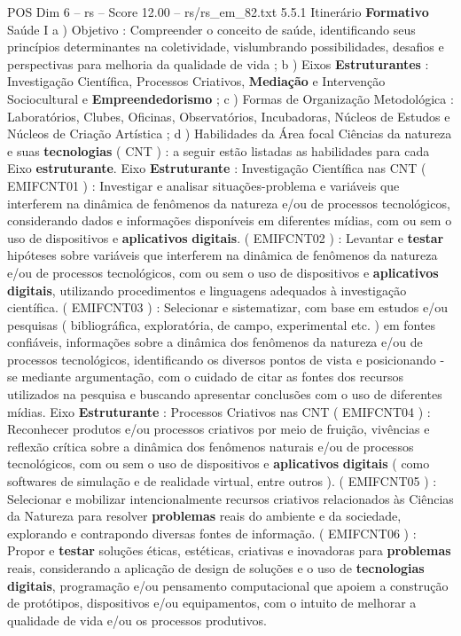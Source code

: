 \begin{textsample}{POS Dim 6 – rs – Score 12.00 – rs/rs\_em\_82.txt}  \label{ex:f6_pos_181}
5.5.1 Itinerário \textbf{Formativo} Saúde I a ) Objetivo : Compreender o conceito de saúde, identificando seus princípios determinantes na coletividade, vislumbrando possibilidades, desafios e perspectivas para melhoria da qualidade de vida ; b ) Eixos \textbf{Estruturantes} : Investigação Científica, Processos Criativos, \textbf{Mediação} e Intervenção Sociocultural e \textbf{Empreendedorismo} ; c ) Formas de Organização Metodológica : Laboratórios, Clubes, Oficinas, Observatórios, Incubadoras, Núcleos de Estudos e Núcleos de Criação Artística ; d ) Habilidades da Área focal Ciências da natureza e suas \textbf{tecnologias} ( CNT ) : a seguir estão listadas as habilidades para cada Eixo \textbf{estruturante}.
Eixo \textbf{Estruturante} : Investigação Científica nas CNT ( EMIFCNT01 ) : Investigar e analisar situações-problema e variáveis que interferem na dinâmica de fenômenos da natureza e/ou de processos tecnológicos, considerando dados e informações disponíveis em diferentes mídias, com ou sem o uso de dispositivos e \textbf{aplicativos} \textbf{digitais}. ( EMIFCNT02 ) : Levantar e \textbf{testar} hipóteses sobre variáveis que interferem na dinâmica de fenômenos da natureza e/ou de processos tecnológicos, com ou sem o uso de dispositivos e \textbf{aplicativos} \textbf{digitais}, utilizando procedimentos e linguagens adequados à investigação científica. ( EMIFCNT03 ) : Selecionar e sistematizar, com base em estudos e/ou pesquisas ( bibliográfica, exploratória, de campo, experimental etc. ) em fontes confiáveis, informações sobre a dinâmica dos fenômenos da natureza e/ou de processos tecnológicos, identificando os diversos pontos de vista e posicionando -se mediante argumentação, com o cuidado de citar as fontes dos recursos utilizados na pesquisa e buscando apresentar conclusões com o uso de diferentes mídias.
Eixo \textbf{Estruturante} : Processos Criativos nas CNT ( EMIFCNT04 ) : Reconhecer produtos e/ou processos criativos por meio de fruição, vivências e reflexão crítica sobre a dinâmica dos fenômenos naturais e/ou de processos tecnológicos, com ou sem o uso de dispositivos e \textbf{aplicativos} \textbf{digitais} ( como softwares de simulação e de realidade virtual, entre outros ). ( EMIFCNT05 ) : Selecionar e mobilizar intencionalmente recursos criativos relacionados às Ciências da Natureza para resolver \textbf{problemas} reais do ambiente e da sociedade, explorando e contrapondo diversas fontes de informação. ( EMIFCNT06 ) : Propor e \textbf{testar} soluções éticas, estéticas, criativas e inovadoras para \textbf{problemas} reais, considerando a aplicação de design de soluções e o uso de \textbf{tecnologias} \textbf{digitais}, programação e/ou pensamento computacional que apoiem a construção de protótipos, dispositivos e/ou equipamentos, com o intuito de melhorar a qualidade de vida e/ou os processos produtivos.

\end{textsample}
